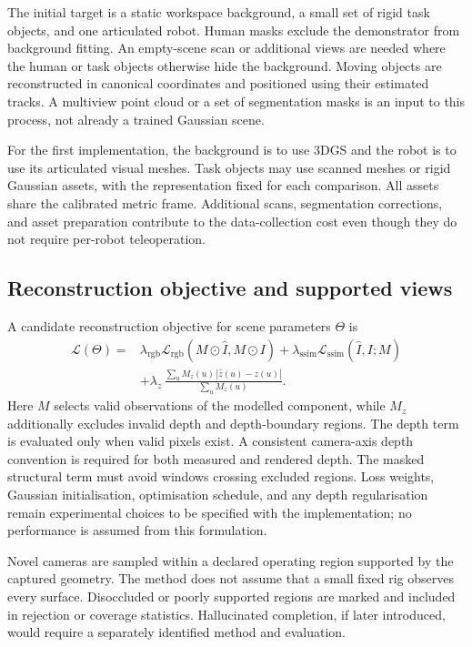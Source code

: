 The initial target is a static workspace background, a small set of rigid
task objects, and one articulated robot. Human masks exclude the
demonstrator from background fitting. An empty-scene scan or additional
views are needed where the human or task objects otherwise hide the
background. Moving objects are reconstructed in canonical coordinates
and positioned using their estimated tracks. A multiview point cloud
or a set of segmentation masks is an input to this process, not already
a trained Gaussian scene.

For the first implementation, the background is to use 3DGS and the robot
is to use its articulated visual meshes. Task objects may use scanned
meshes or rigid Gaussian assets, with the representation fixed for each
comparison. All assets share the calibrated metric frame. Additional
scans, segmentation corrections, and asset preparation contribute to the
data-collection cost even though they do not require per-robot teleoperation.

\subsection{Reconstruction objective and supported views}

A candidate reconstruction objective for scene parameters $\Theta$ is
\begin{equation}
\begin{split}
  \mathcal L(\Theta)=&\lambda_{\mathrm{rgb}}
       \mathcal L_{\mathrm{rgb}}(M\odot\hat I,M\odot I)
       +\lambda_{\mathrm{ssim}}\mathcal L_{\mathrm{ssim}}(\hat I,I;M)\\
       &+\lambda_z\,
       \frac{\sum_{u}M_z(u)\,|\hat z(u)-z(u)|}
            {\sum_u M_z(u)}.
\end{split}
\label{eq:gs-loss}
\end{equation}
Here $M$ selects valid observations of the modelled component, while
$M_z$ additionally excludes invalid depth and depth-boundary regions.
The depth term is evaluated only when valid pixels exist. A consistent
camera-axis depth convention is required for both measured and rendered
depth. The masked structural term must avoid windows crossing excluded
regions. Loss weights, Gaussian initialisation, optimisation schedule,
and any depth regularisation remain experimental choices to be specified
with the implementation; no performance is assumed from this formulation.

Novel cameras are sampled within a declared operating region supported
by the captured geometry. The method does not assume that a small fixed
rig observes every surface. Disoccluded or poorly supported regions are
marked and included in rejection or coverage statistics. Hallucinated
completion, if later introduced, would require a separately identified
method and evaluation.

